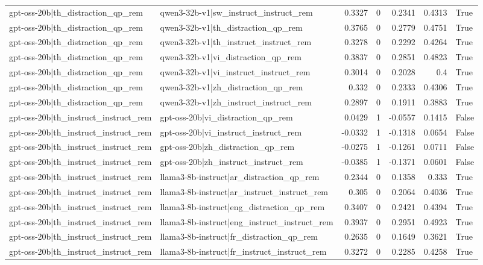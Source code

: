 \begin{table}
\begin{tabular}{l l r r r r l}
gpt-oss-20b|th_distraction_qp_rem & qwen3-32b-v1|sw_instruct_instruct_rem & 0.3327 & 0 & 0.2341 & 0.4313 & True \\
gpt-oss-20b|th_distraction_qp_rem & qwen3-32b-v1|th_distraction_qp_rem & 0.3765 & 0 & 0.2779 & 0.4751 & True \\
gpt-oss-20b|th_distraction_qp_rem & qwen3-32b-v1|th_instruct_instruct_rem & 0.3278 & 0 & 0.2292 & 0.4264 & True \\
gpt-oss-20b|th_distraction_qp_rem & qwen3-32b-v1|vi_distraction_qp_rem & 0.3837 & 0 & 0.2851 & 0.4823 & True \\
gpt-oss-20b|th_distraction_qp_rem & qwen3-32b-v1|vi_instruct_instruct_rem & 0.3014 & 0 & 0.2028 & 0.4 & True \\
gpt-oss-20b|th_distraction_qp_rem & qwen3-32b-v1|zh_distraction_qp_rem & 0.332 & 0 & 0.2333 & 0.4306 & True \\
gpt-oss-20b|th_distraction_qp_rem & qwen3-32b-v1|zh_instruct_instruct_rem & 0.2897 & 0 & 0.1911 & 0.3883 & True \\
gpt-oss-20b|th_instruct_instruct_rem & gpt-oss-20b|vi_distraction_qp_rem & 0.0429 & 1 & -0.0557 & 0.1415 & False \\
gpt-oss-20b|th_instruct_instruct_rem & gpt-oss-20b|vi_instruct_instruct_rem & -0.0332 & 1 & -0.1318 & 0.0654 & False \\
gpt-oss-20b|th_instruct_instruct_rem & gpt-oss-20b|zh_distraction_qp_rem & -0.0275 & 1 & -0.1261 & 0.0711 & False \\
gpt-oss-20b|th_instruct_instruct_rem & gpt-oss-20b|zh_instruct_instruct_rem & -0.0385 & 1 & -0.1371 & 0.0601 & False \\
gpt-oss-20b|th_instruct_instruct_rem & llama3-8b-instruct|ar_distraction_qp_rem & 0.2344 & 0 & 0.1358 & 0.333 & True \\
gpt-oss-20b|th_instruct_instruct_rem & llama3-8b-instruct|ar_instruct_instruct_rem & 0.305 & 0 & 0.2064 & 0.4036 & True \\
gpt-oss-20b|th_instruct_instruct_rem & llama3-8b-instruct|eng_distraction_qp_rem & 0.3407 & 0 & 0.2421 & 0.4394 & True \\
gpt-oss-20b|th_instruct_instruct_rem & llama3-8b-instruct|eng_instruct_instruct_rem & 0.3937 & 0 & 0.2951 & 0.4923 & True \\
gpt-oss-20b|th_instruct_instruct_rem & llama3-8b-instruct|fr_distraction_qp_rem & 0.2635 & 0 & 0.1649 & 0.3621 & True \\
gpt-oss-20b|th_instruct_instruct_rem & llama3-8b-instruct|fr_instruct_instruct_rem & 0.3272 & 0 & 0.2285 & 0.4258 & True \\

\end{tabular}
\end{table}

